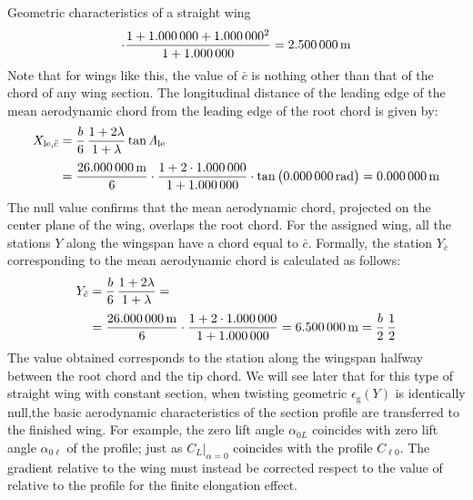 \documentclass[[12pt,twoside]{book}
\begin{document}
\begin{myExampleX}{Geometric characteristics of a straight wing}{}
\[\begin{split}
      \cdot 
        \frac{
          1 + \SI[round-precision=0]{\myTaperRatioWing}{} + \SI[round-precision=0]{\myTaperRatioWing}{}^2
        }{
          1 + \SI[round-precision=0]{\myTaperRatioWing}{}
        }
    = \SI[round-precision=2]{\myMACWingMT}{\metre} 
\end{split}
\]
Note that for wings like this, the value of $\bar{c} $ is nothing other than that of the chord of any wing section.
\noindent
The longitudinal distance of the leading edge of the mean aerodynamic chord from the leading edge of the root chord is given by:
\[
\begin{split}
X_{\mathrm{le},\bar{c}} 
  & {}=
    \frac{b}{6} \, \frac{1+2\lambda}{1+\lambda} \tan\Lambda_\mathrm{le} \\[3pt]
  & {}=
    \frac{\SI[round-precision=1]{\mySpanWingMT}{\metre}}{6}
      \cdot 
      \frac{
        1 + 2\cdot\SI[round-precision=0]{\myTaperRatioWing}{}
      }{
        1 + \SI[round-precision=0]{\myTaperRatioWing}{}
      }
      \cdot \tan \big( \SI[round-precision=0]{\myLambdaLERad}{\radian} \big)
    = { \SI[round-precision=0]{\myXLEMACWingMT}{\metre} }%
\end{split}
\]
The null value confirms that the mean aerodynamic chord, projected on the center plane of the wing, overlaps the root chord.
\noindent
For the assigned wing, all the stations $Y$ along the wingspan have a chord equal to $\bar{c}$. Formally, the station $Y_{\bar{c}}$ corresponding to the mean aerodynamic chord is calculated as follows:
\[
\begin{split}
Y_{\bar{c}} 
  & {}=
    \frac{b}{6} \, \frac{1+2\lambda}{1+\lambda} = \\[3pt]
  & {}=
    \frac{\SI[round-precision=1]{\mySpanWingMT}{\metre}}{6}
      \cdot 
      \frac{
        1 + 2\cdot\SI[round-precision=2]{\myTaperRatioWing}{}
      }{
        1 + \SI[round-precision=2]{\myTaperRatioWing}{}
      }
    = { \SI[round-precision=2]{\myYMACWingMT}{\metre} }
    = \frac{b}{2} \, \frac{1}{2}
\end{split}
\]
The value obtained corresponds to the station along the wingspan halfway between the root chord and the tip chord. We will see later that for this type of straight wing with constant section, when twisting geometric $\epsilon_\mathrm{g}(Y)$ is identically null,the basic aerodynamic characteristics of the section profile are transferred to the finished wing. For example, the zero lift angle $\alpha_{0L}$ coincides with  zero lift angle $\alpha_{0\ell}$ of the profile; just as $C_L \big|_{\alpha = 0} $ coincides with the profile $C_{\ell 0}$. The gradient  relative to the wing must instead be corrected respect to the value of  relative to the profile for the finite elongation effect.
\end{myExampleX}
\end{document}
